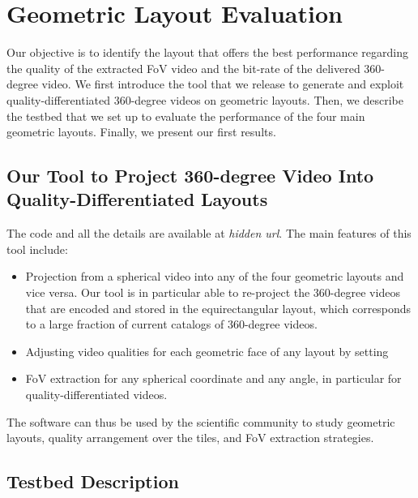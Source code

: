 \section{Geometric Layout Evaluation}

Our objective is to identify the layout that offers the best performance regarding the quality of
the extracted \ac{FoV} video and the bit-rate of the delivered 360-degree video. We first introduce
the tool that we release to generate and exploit quality-differentiated
360-degree videos on geometric layouts. Then, we describe the testbed that we set up to evaluate the
performance of the four main geometric layouts. Finally, we present our first results.

\subsection{Our Tool to Project 360-degree Video Into Quality-Differentiated Layouts}

The code and all the details are available at \textit{hidden url}. The main features of this tool include:
\begin{itemize}
\item Projection from a spherical video into any of the four geometric layouts and vice versa. Our tool is in
particular able to re-project the 360-degree videos that are encoded and stored in the equirectangular layout,
which corresponds to a large fraction of current catalogs of 360-degree videos.
\item Adjusting video qualities for each geometric face of any layout by setting 
\item \ac{FoV} extraction for any spherical coordinate and any angle, in particular for quality-differentiated videos.
\end{itemize}

The software can thus be used by the scientific community to study geometric layouts, quality arrangement over the tiles, and \ac{FoV} extraction strategies.

\subsection{Testbed Description}


